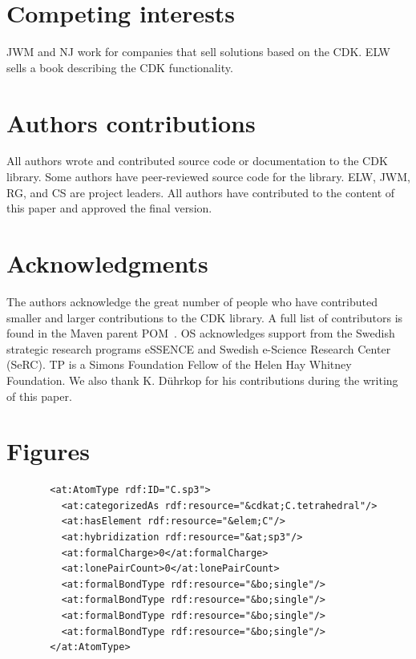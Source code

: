 \documentclass[10pt]{bmcart}
\begin{document}
\begin{backmatter}

\section*{Competing interests}
JWM and NJ work for companies that sell solutions based on the CDK. ELW sells
a book describing the CDK functionality.

\section*{Authors contributions}
All authors wrote and contributed source code or documentation to the CDK
library. Some authors have peer-reviewed source code for the library.
ELW, JWM, RG, and CS are project leaders. All authors have contributed to the
content of this paper and approved the final version.

\section*{Acknowledgments}
The authors acknowledge the great number of people who have contributed smaller
and larger contributions to the CDK library. A full list of contributors is
found in the Maven parent POM~\cite{AUTHORS}. OS acknowledges support from the Swedish strategic research programs eSSENCE and Swedish e-Science Research Center (SeRC). TP is a Simons Foundation Fellow of the Helen Hay Whitney Foundation.
We also thank K. Dührkop for his contributions during the writing of this paper.




\newpage

\section*{Figures}

\begin{figure}[h!]
\caption{}
\begin{verbatim}
  <at:AtomType rdf:ID="C.sp3">
    <at:categorizedAs rdf:resource="&cdkat;C.tetrahedral"/>
    <at:hasElement rdf:resource="&elem;C"/>
    <at:hybridization rdf:resource="&at;sp3"/>
    <at:formalCharge>0</at:formalCharge>
    <at:lonePairCount>0</at:lonePairCount>
    <at:formalBondType rdf:resource="&bo;single"/>
    <at:formalBondType rdf:resource="&bo;single"/>
    <at:formalBondType rdf:resource="&bo;single"/>
    <at:formalBondType rdf:resource="&bo;single"/>
  </at:AtomType>
\end{verbatim}
  \label{fig:atomtype}
\end{figure}



\end{backmatter}
\end{document}

